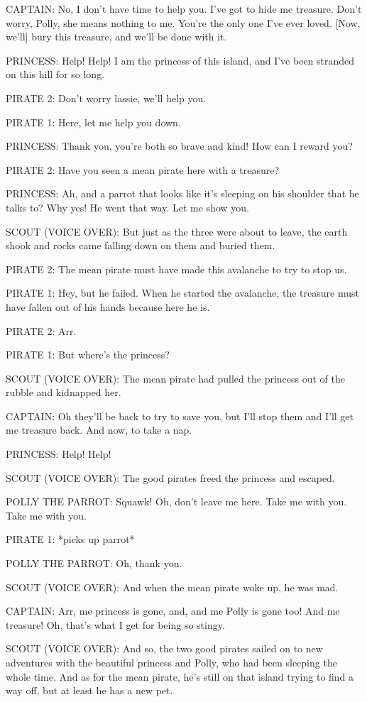 CAPTAIN:
No, I don't have time to help you.
I've got to hide me treasure.
Don't worry, Polly, she means nothing to me.
You're the only one I've ever loved.
    [Now, we'll] bury this treasure, and we'll be done with it.

PRINCESS:
Help!
Help!
I am the princess of this island, and I've been stranded on this hill for so long.

PIRATE 2:
Don't worry lassie, we'll help you.

PIRATE 1:
Here, let me help you down.

PRINCESS:
Thank you, you're both so brave and kind!
How can I reward you?

PIRATE 2:
Have you seen a mean pirate here with a treasure?

PRINCESS:
Ah, and a parrot that looks like it's sleeping on his shoulder that he talks to?
Why yes!
He went that way.
Let me show you.

SCOUT (VOICE OVER):
But just as the three were about to leave, the earth shook and rocks came falling down on them and buried them.

PIRATE 2:
The mean pirate must have made this avalanche to try to stop us.

PIRATE 1:
Hey, but he failed.
When he started the avalanche, the treasure must have fallen out of his hands because here he is.

PIRATE 2:
Arr.

PIRATE 1:
But where's the princess?

SCOUT (VOICE OVER):
The mean pirate had pulled the princess out of the rubble and kidnapped her.

CAPTAIN:
Oh they'll be back to try to save you, but I'll stop them and I'll get me treasure back.
And now, to take a nap.

PRINCESS:
Help!
Help!

SCOUT (VOICE OVER):
The good pirates freed the princess and escaped.

POLLY THE PARROT:
Squawk!
Oh, don't leave me here.
Take me with you.
Take me with you.

PIRATE 1:
*picks up parrot*

POLLY THE PARROT:
Oh, thank you.

SCOUT (VOICE OVER):
And when the mean pirate woke up, he was mad.

CAPTAIN:
Arr, me princess is gone, and, and me Polly is gone too!
And me treasure!
Oh, that's what I get for being so stingy.

SCOUT (VOICE OVER):
And so, the two good pirates sailed on to new adventures with the beautiful princess and Polly, who had been sleeping the whole time.
And as for the mean pirate, he's still on that island trying to find a way off, but at least he has a new pet.

